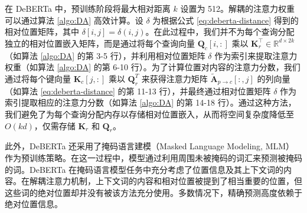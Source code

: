 在 DeBERTa 中，预训练阶段将最大相对距离 \(k\) 设置为 512。解耦的注意力权重可以通过算法 \ref{algo:DA} 高效计算。设 \(\delta\) 为根据公式 \ref{eq:deberta-distance} 得到的相对位置矩阵，其中 \(\delta[i, j] = \delta(i, j)\)。在此过程中，我们并不为每个查询分配独立的相对位置嵌入矩阵，而是通过将每个查询向量 \(\mathbf{Q}_{c}[i, :]\) 乘以 \(\mathbf{K}_{r}^{\intercal} \in \mathbb{R}^{d \times 2k}\)（如算法 \ref{algo:DA} 的第 3-5 行），并利用相对位置矩阵 \(\delta\) 作为索引来提取注意力权重（如算法 \ref{algo:DA} 的第 6-10 行）。为了计算位置对内容的注意力分数，我们通过将每个键向量 \(\mathbf{K}_{c}[j, :]\) 乘以 \(\mathbf{Q}_{r}^{T}\) 来获得注意力矩阵 \(\tilde{\mathbf{A}}_{p \to c}[:, j]\) 的列向量（如算法 \ref{eq:deberta-distance} 的第 11-13 行），并最终通过相对位置矩阵 \(\delta\) 作为索引提取相应的注意力分数（如算法 \ref{algo:DA} 的第 14-18 行）。通过这种方法，我们避免了为每个查询分配内存以存储相对位置嵌入，从而将空间复杂度降低至 \(O(kd)\)，仅需存储 \(\mathbf{K}_{r}\) 和 \(\mathbf{Q}_{r}\)。

此外，DeBERTa 还采用了掩码语言建模（Masked Language Modeling, MLM）作为预训练策略。在这一过程中，模型通过利用周围未被掩码的词汇来预测被掩码的词。DeBERTa 在掩码语言模型任务中充分考虑了位置信息及其上下文词的内容。在解耦注意力机制，上下文词的内容和相对位置被提到了相当重要的位置，但这些词的绝对位置却并没有被该方法充分使用。多数情况下，精确预测高度依赖于绝对位置信息。

